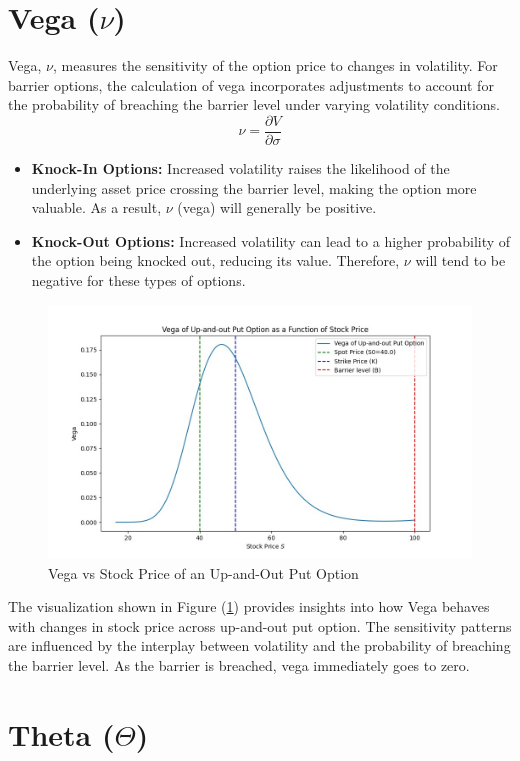 \section{Vega ($\nu$)}

Vega, $\nu$, measures the sensitivity of the option price to changes in volatility. For barrier options, the calculation of vega incorporates adjustments to account for the probability of breaching the barrier level under varying volatility conditions.
\[
\nu = \frac{\partial V}{\partial \sigma}
\]

\begin{itemize}
	\item \textbf{Knock-In Options:} Increased volatility raises the likelihood of the underlying asset price crossing the barrier level, making the option more valuable. As a result, \(\nu\) (vega) will generally be positive.
	\item \textbf{Knock-Out Options:} Increased volatility can lead to a higher probability of the option being knocked out, reducing its value. Therefore, \(\nu\) will tend to be negative for these types of options.
\end{itemize}

\begin{figure}[H]
    \centering
    \includegraphics[width=.65\linewidth]{content/images/vega_upout.png}
    \caption{Vega vs Stock Price of an Up-and-Out Put Option}
    \label{fig:vega_behavior}
\end{figure}

The visualization shown in Figure (\ref{fig:vega_behavior}) provides insights into how Vega behaves with changes in stock price across up-and-out put option. The sensitivity patterns are influenced by the interplay between volatility and the probability of breaching the barrier level. As the barrier is breached, vega immediately goes to zero.

\section{Theta ($\Theta$)}

